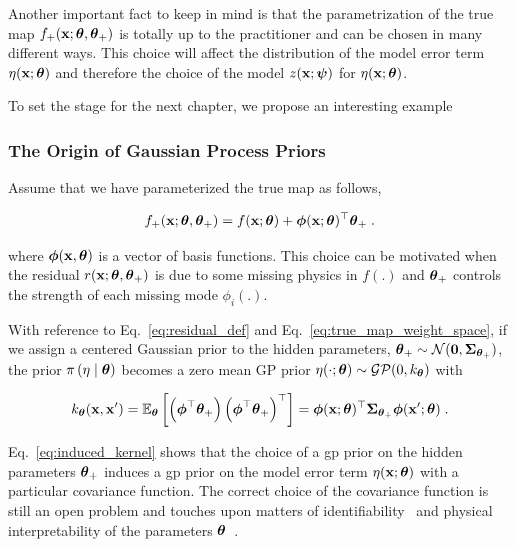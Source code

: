 \smallskip
Another important fact to keep in mind is that the parametrization of the true map $f_+(\mathbf{x}; \boldsymbol{\theta}, \boldsymbol{\theta}_+)$ is totally up to the practitioner and can be chosen in many different ways. This choice will affect the distribution of the model error term $\eta(\mathbf{x}; \boldsymbol{\theta})$ and therefore the choice of the model $z(\mathbf{x}; \boldsymbol{\psi})$ for $\eta(\mathbf{x}; \boldsymbol{\theta})$. 

\smallskip
To set the stage for the next chapter, we propose an interesting example 

\subsubsection{The Origin of Gaussian Process Priors}

Assume that we have parameterized the true map as follows,

\begin{equation}
    f_+(\mathbf{x}; \boldsymbol{\theta}, \boldsymbol{\theta}_+) = f(\mathbf{x}; \boldsymbol{\theta}) + \boldsymbol{\phi}(\mathbf{x}; \boldsymbol{\theta})^{\top} \boldsymbol{\theta}_+ \;.
    \label{eq:true_map_weight_space}
\end{equation}

where $\boldsymbol{\phi}(\mathbf{x}, \boldsymbol{\theta})$ is a vector of basis functions. This choice can be motivated when the residual $r(\mathbf{x};\boldsymbol{\theta}, \boldsymbol{\theta}_+)$ is due to some missing physics in $f(.)$ and $\boldsymbol{\theta}_+$ controls the strength of each missing mode $\phi_i(.)$. 

\smallskip
With reference to Eq.~\eqref{eq:residual_def} and Eq.~\eqref{eq:true_map_weight_space}, if we assign a centered Gaussian prior to the hidden parameters, $\boldsymbol{\theta}_+ \sim \mathcal{N}(\boldsymbol{0}, \boldsymbol{\Sigma}_{\boldsymbol{\theta}_+})$, the prior $\pi \left( \eta \mid \boldsymbol{\theta}\right)$ becomes a zero mean GP prior $\eta(\cdot;\boldsymbol{\theta}) \sim \mathcal{GP}(0, k_{\boldsymbol{\theta}})$ with

\begin{equation}
    k_{\boldsymbol{\theta}}(\mathbf{x}, \mathbf{x}') = \mathbb{E}_{\boldsymbol{\theta}}\left[ \left(\boldsymbol{\phi}^{\top} \boldsymbol{\theta}_+\right) \left(\boldsymbol{\phi}^{\top} \boldsymbol{\theta}_+\right)^{\top} \right] = \boldsymbol{\phi}(\mathbf{x}; \boldsymbol{\theta})^{\top} \boldsymbol{\Sigma}_{\boldsymbol{\theta}_+} \boldsymbol{\phi}(\mathbf{x}'; \boldsymbol{\theta}) \;.
    \label{eq:induced_kernel}
\end{equation}


Eq.~\eqref{eq:induced_kernel} shows that the choice of a \gls{gp} prior on the hidden parameters $\boldsymbol{\theta}_+$ induces a \gls{gp} prior on the model error term $\eta(\mathbf{x}; \boldsymbol{\theta})$ with a particular covariance function. The correct choice of the covariance function is still an open problem and touches upon matters of identifiability~\cite{Plumlee2017} and physical interpretability of the parameters $\boldsymbol{\theta}$~\cite{hagan_2014}. 

